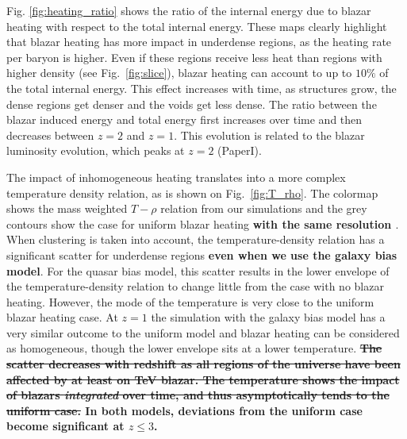 \documentclass[twocolumns]{emulateapj}
\newcommand\ALc[1]{{\color{red} \bf #1}} %
\begin{document}
{Fig. \ref{fig:heating_ratio} shows the ratio of the internal energy due to  blazar heating with respect to the total internal energy.  These maps clearly highlight that blazar heating has more impact in underdense regions, as the heating rate per baryon is higher. Even if these regions receive less heat than regions with higher density (see Fig.~\ref{fig:slice}), blazar heating can account to up to $10\%$ of the total internal energy.  This effect increases with time, as structures grow, the dense regions get denser and the voids get less dense. The ratio between the blazar induced energy and total energy first increases over time and then decreases between $z=2$ and $z=1$.  This evolution is related to the blazar luminosity evolution, which peaks at $z=2$ (PaperI).

The impact of inhomogeneous heating translates into a more complex temperature density relation, as is shown on Fig.~\ref{fig:T_rho}. The colormap shows the mass weighted $T-\rho$ relation from our simulations and the grey contours show the case for uniform blazar heating  \ALc{with the same resolution \citep{2012MNRAS.423..149P}}. When clustering is taken into account, the temperature-density relation has a significant scatter for underdense regions \ALc{even when we use the galaxy bias model}. For the quasar bias model, this scatter results in the lower envelope of the temperature-density relation to change little from the case with no blazar heating.  However, the mode of the temperature is very close to the uniform blazar heating case. At $z=1$ the simulation with the galaxy bias model has a very similar outcome to the uniform model and  blazar heating can be considered as homogeneous, though the lower envelope sits at a lower temperature.  \ALc{\sout{The scatter decreases with redshift as all regions of the universe have been affected by at least on TeV blazar. The temperature shows the impact of blazars \textit{integrated} over time, and thus asymptotically tends to the uniform case. } In both models, deviations from the uniform case become significant at $z\leqslant 3$.}





}
\end{document}
